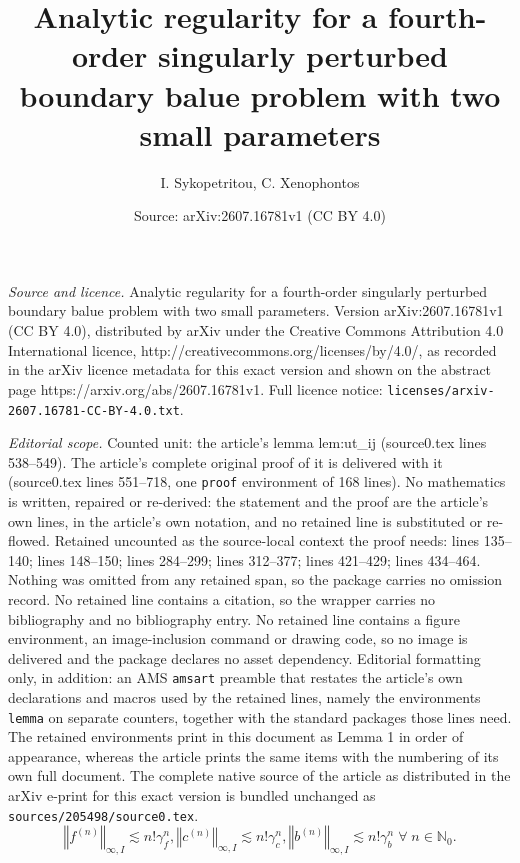 \documentclass[10pt,a4paper]{amsart}
\title{Analytic regularity for a fourth-order singularly perturbed boundary balue problem with two small parameters}
\author{I. Sykopetritou, C. Xenophontos}
\date{Source: arXiv:2607.16781v1 (CC BY 4.0)}
\begin{document}
\maketitle

\noindent\emph{Source and licence.} Analytic regularity for a fourth-order singularly perturbed boundary balue problem with two small parameters. Version arXiv:2607.16781v1 (CC BY 4.0), distributed by arXiv under the Creative Commons Attribution 4.0 International licence, http://creativecommons.org/licenses/by/4.0/, as recorded in the arXiv licence metadata for this exact version and shown on the abstract page https://arxiv.org/abs/2607.16781v1. Full licence notice: \texttt{licenses/arxiv-2607.16781-CC-BY-4.0.txt}.\par\smallskip

\noindent\textit{Editorial scope.} Counted unit: the article's lemma lem:ut\_ij (source0.tex lines 538--549). The article's complete original proof of it is delivered with it (source0.tex lines 551--718, one \texttt{proof} environment of 168 lines). No mathematics is written, repaired or re-derived: the statement and the proof are the article's own lines, in the article's own notation, and no retained line is substituted or re-flowed.  Retained uncounted as the source-local context the proof needs: lines 135--140; lines 148--150; lines 284--299; lines 312--377; lines 421--429; lines 434--464.  Nothing was omitted from any retained span, so the package carries no omission record.  No retained line contains a citation, so the wrapper carries no bibliography and no bibliography entry.  No retained line contains a figure environment, an image-inclusion command or drawing code, so no image is delivered and the package declares no asset dependency.  Editorial formatting only, in addition: an AMS \texttt{amsart} preamble that restates the article's own declarations and macros used by the retained lines, namely the environments \texttt{lemma} on separate counters, together with the standard packages those lines need.  The retained environments print in this document as Lemma 1 in order of appearance, whereas the article prints the same items with the numbering of its own full document.  The complete native source of the article as distributed in the arXiv e-print for this exact version is bundled unchanged as \texttt{sources/205498/source0.tex}.
\begin{equation}
\left\Vert f^{(n)}\right\Vert _{\infty ,I}\lesssim n!\gamma
_{f}^{n},\left\Vert c^{(n)}\right\Vert _{\infty ,I}\lesssim n!\gamma
_{c}^{n},\left\Vert b^{(n)}\right\Vert _{\infty ,I}\lesssim n!\gamma
_{b}^{n}\;\forall \;n\in \mathbb{N}_{0}.  \label{analytic}
\end{equation}%
\end{document}
